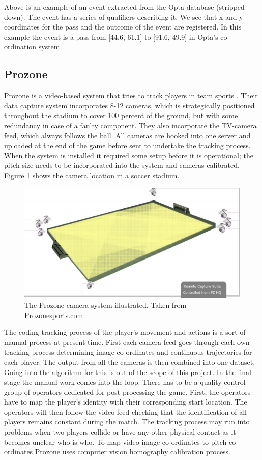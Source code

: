 Above is an example of an event extracted from the Opta database (stripped down). The event has a series of qualifiers describing it. We see that x and y coordinates for the pass and the outcome of the event are registered. In this example the event is a pass from [44.6, 61.1] to [91.6, 49.9] in Opta’s co-ordination system.

\subsection{Prozone}
\label{sec:prozone}
Prozone is a video-based system that tries to track players in team sports \cite{Prozone:indepth}. Their data capture system incorporates 8-12 cameras, which is strategically positioned throughout the stadium to cover 100 percent of the ground, but with some redundancy in case of a faulty component. They also incorporate the TV-camera feed, which always follows the ball. All cameras are hooked into one server and uploaded at the end of the game before sent to undertake the tracking process. When the system is installed it required some setup before it is operational; the pitch size needs to be incorporated into the system and cameras calibrated. Figure \ref{fig:prozonecam} shows the camera location in a soccer stadium.

\begin{figure}[ht!]
\centering
\includegraphics[width=1\textwidth]{images/general/prozonecam.png}
\caption{The Prozone camera system illustrated. Taken from Prozonesports.com}
\label{fig:prozonecam}
\end{figure}

The coding tracking process of the player's movement and actions is a sort of manual process at present time. First each camera feed goes through each own tracking process determining image co-ordinates and continuous trajectories for each player. The output from all the cameras is then combined into one dataset. Going into the algorithm for this is out of the scope of this project. In the final stage the manual work comes into the loop. There has to be a quality control group of operators dedicated for post processing the game. First, the operators have to map the player’s identity with their corresponding start location. The operators will then follow the video feed checking that the identification of all players remains constant during the match. The tracking process may run into problems when two players collide or have any other physical contact as it becomes unclear who is who. To map video image co-ordinates to pitch co-ordinates Prozone uses computer vision homography calibration process.

